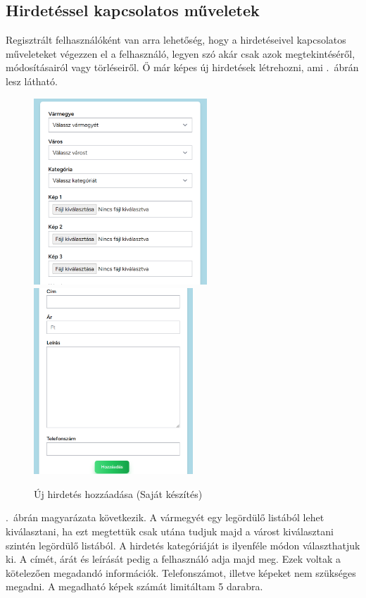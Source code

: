 \documentclass[]{thesis-ekf}
\theoremstyle{definition}
\theoremstyle{remark}
\begin{document}
	\subsection{Hirdetéssel kapcsolatos műveletek}
		Regisztrált felhasználóként van arra lehetőség, hogy a hirdetéseivel kapcsolatos műveleteket végezzen el a felhasználó, legyen szó akár csak azok megtekintéséről, módosításairól vagy törléseiről. Ő már képes új hirdetések létrehozni, ami .~ábrán lesz látható.
		\begin{figure}[ht!]
			\centering
			\includegraphics[height=7cm]{./felhasznaloi/hozzadas1}
			\includegraphics[height=7cm]{./felhasznaloi/hozzadas2}
			\caption{Új hirdetés hozzáadása (Saját készítés)} 
			\label{hirdetes-hozzadas-muvelet}
		\end{figure}
		.~ábrán magyarázata következik. A vármegyét egy legördülő listából lehet kiválasztani, ha ezt megtettük csak utána tudjuk majd a várost kiválasztani szintén legördülő listából. A hirdetés kategóriáját is ilyenféle módon választhatjuk ki. A címét, árát és leírását pedig a felhasználó adja majd meg. Ezek voltak a kötelezően megadandó információk. Telefonszámot, illetve képeket nem szükséges megadni. A megadható képek számát limitáltam 5 darabra.
\end{document}
